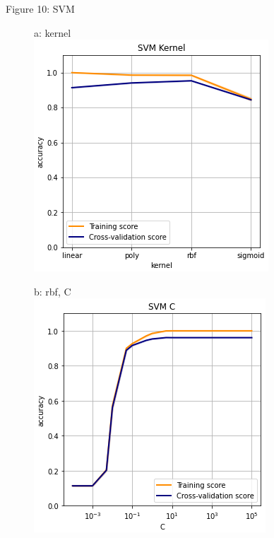 \documentclass{article}
\begin{document}
\begin{figure}
	\centering
	Figure 10: SVM\\
	\begin{subfigure}{.32\textwidth}
		\centering
		a: kernel\\
		\includegraphics[width=\linewidth]{mnist_svm_kernel.png}
		
	\end{subfigure}
	\begin{subfigure}{.32\textwidth}
		\centering
		b: rbf, C\\
		\includegraphics[width=\linewidth]{mnist_svm_C.png}
		

\end{subfigure}
\end{figure}
\end{document}
